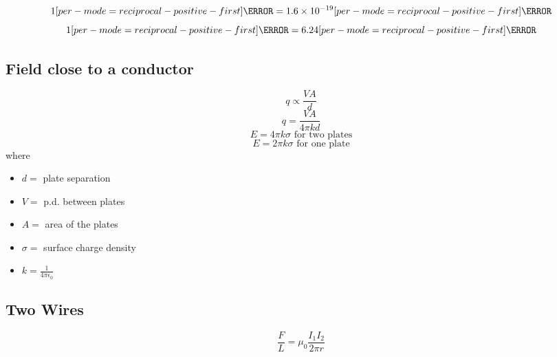 \documentclass[a4paper,12pt]{article}
\let\oldsi\si
\renewcommand{\si}[1]{\oldsi[per-mode=reciprocal-positive-first]{#1}}
\begin{document}
$$1\si{\eV} = 1.6 \times 10^{-19} \si{\J}$$
$$1\si{\J} = 6.24\si{\eV}$$

\subsection{Field close to a conductor}

$$q\propto \frac{VA}{d}$$
$$q=\frac{VA}{4\pi kd}$$
$$E = 4\pi k \sigma \text{ for two plates}$$
$$E = 2\pi k \sigma \text{ for one plate}$$
where
\begin{itemize}
  \item $d = $ plate separation
  \item $V  = $ p.d. between plates
  \item $A = $ area of the plates
  \item $\sigma = $ surface charge density
  \item $k =\frac{1}{4\pi \epsilon_0} $

\end{itemize}

\subsection{Two Wires}

$$\frac{F}{L} = \mu_0\frac{I_1I_2}{2\pi r}$$
\end{document}

